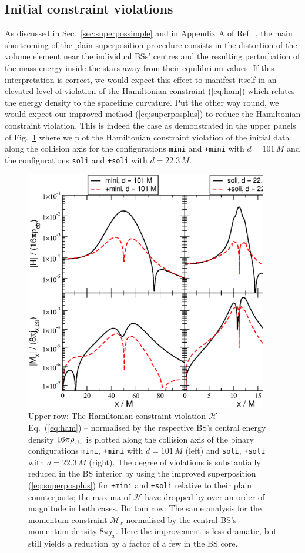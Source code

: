 \documentclass[]{iopart}
\begin{document}
\subsection{Initial constraint violations}
%
As discussed in Sec.~\ref{sec:superpossimple} and in Appendix A of
Ref.~\cite{Helfer:2018vtq}, the main shortcoming of the plain
superposition procedure consists in the distortion of the volume
element near the individual BSs' centres and the resulting perturbation
of the mass-energy inside the stars away from their equilibrium
values. If this interpretation is correct, we would expect this
effect to manifest itself in an elevated level of violation of the
Hamiltonian constraint (\ref{eq:ham}) which relates the energy
density to the spacetime curvature. Put the other way round, we
would expect our improved method (\ref{eq:superposplus}) to reduce
the Hamiltonian constraint violation. This is indeed the case as
demonstrated in the upper panels of Fig.~\ref{fig:ham} where we
plot the Hamiltonian constraint violation of the initial data along
the collision axis for the configurations {\tt mini} and {\tt +mini}
with $d=101\,M$ and the configurations {\tt soli} and {\tt +soli}
with $d=22.3\,M$.
%
\begin{figure}
  \centering
  \includegraphics[width=300pt]{constraints.eps}
  \caption{
  Upper row: The Hamiltonian constraint violation $\mathcal{H}$ --
  Eq.~(\ref{eq:ham}) -- normalised by the respective BS's central
  energy density $16\pi \rho_{\rm ctr}$ is plotted along the collision
  axis of the binary configurations {\tt mini}, {\tt +mini} with
  $d=101\,M$ (left) and {\tt soli}, {\tt +soli} with $d=22.3\,M$
  (right).  The degree of violations is substantially reduced in
  the BS interior by using the improved superposition
  (\ref{eq:superposplus}) for {\tt +mini} and {\tt +soli} relative
  to their plain counterparts; the maxima of $\mathcal{H}$ have
  dropped by over an order of magnitude in both cases.  Bottom row:
  The same analysis for the momentum constraint $\mathcal{M}_x$
  normalised by the central BS's momentum density $8\pi j_x$. Here
  the improvement is less dramatic, but still yields a reduction
  by a factor of a few in the BS core.
  }
  \label{fig:ham}
\end{figure}
%
\end{document}
